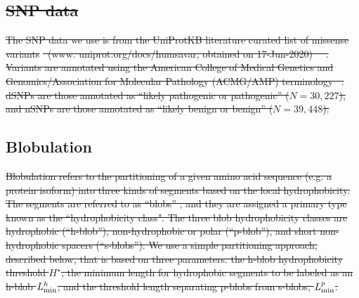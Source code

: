 \documentclass[9pt,twocolumn,twoside,lineno]{pnas-new} %
\newcommand{\dSNPs}{dSNPs~}
\newcommand{\nSNPs}{nSNPs~}
\newcommand{\hydrochar}{hydrophobicity class}
\newcommand{\matt}[1]{\textcolor{black}{#1}} %
\newcommand{\hydrothresh}{H^{\star}}
\newcommand{\cmin}{\hydrothresh}
\newcommand{\Lminp}{L_{\rm min}^p}
\newcommand{\Lminh}{L_{\rm min}^h}
\providecommand{\DIFdel}[1]{{\protect\color{red}\sout{#1}}}                      %
\providecommand{\DIFdelbegin}{} %
\providecommand{\DIFdelend}{} %
\begin{document}
\subsection*{\DIFdel{SNP data}}
\DIFdel{The SNP data we use is from the UniProtKB literature curated list of missense variants}%
\DIFdel{~(www. uniprot.org/docs/humsavar, obtained on 17-Jun-2020)~\mbox{%
\citep{Yip2008}}\hspace{0pt}%
. Variants are annotated using the American College of Medical Genetics and Genomics/Association for Molecular Pathology (ACMG/AMP) terminology\mbox{%
\citep{Richards2015}}\hspace{0pt}%
. dSNPs are those annotated as ``likely pathogenic or pathogenic'' ($N=30,227$), and nSNPs are those annotated as ``likely benign or benign'' ($N=39,448$). %
}%


\DIFdelend \subsection*{Blobulation}
\DIFdelbegin \DIFdel{Blobulation refers to the partitioning of a given amino acid sequence (e.g. a protein isoform) into three kinds of segments based on the local hydrophobicity. The segments are referred to as ``blobs'' , and they are assigned a primary type known as the ``\hydrochar". The three blob hydrophobicity classes are hydrophobic (``h-blob''), non-hydrophobic or polar (``p-blob''), and short non-hydrophobic spacers (``s-blobs''). We use a simple partitioning approach, described below, that is based on three parameters: the h-blob hydrophobicity threshold $\cmin$, the minimum length for hydrophobic segments to be labeled as an h-blob $\Lminh$, and the threshold length separating p-blobs from s-blobs, $\Lminp$.
}%
\end{document}
